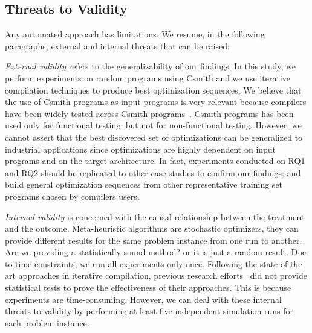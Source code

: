 \subsection{Threats to Validity}
Any automated approach has limitations. We resume, in the following paragraphs, external and internal threats that can be raised:
 
\textit{External validity} refers to the generalizability of our findings. In this study, we perform experiments on random programs using Csmith and we use iterative compilation techniques to produce best optimization sequences. We believe that the use of Csmith programs as input programs is very relevant because compilers have been widely tested across Csmith programs~\cite{chen2016empirical,yang2011finding}. Csmith programs has been used only for functional testing, but not for non-functional testing. However, we cannot assert that the best discovered set of optimizations can be generalized to industrial applications since optimizations are highly dependent on input programs and on the target architecture. In fact, experiments conducted on RQ1 and RQ2 should be replicated to other case studies to confirm our findings; and build general optimization sequences from other representative training set programs chosen by compilers users.

\textit{Internal validity} is concerned with the causal relationship between the treatment and the outcome. Meta-heuristic algorithms are stochastic optimizers, they can provide different results for the same problem instance from one run to another. Are we providing a statistically sound method? or it is just a random result. Due to time constraints, we run all experiments only once. Following the state-of-the-art approaches in iterative compilation, previous research efforts~\cite{hoste2008cole,martinez2014multi} did not provide statistical tests to prove the effectiveness of their approaches. This is because experiments are time-consuming. However, we can deal with these internal threats to validity by performing at least five independent simulation runs for each problem instance.  
 
